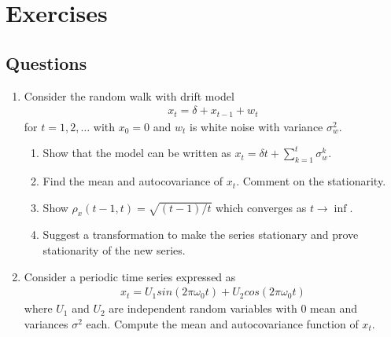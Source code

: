 \documentclass[../../time_series_notes.tex]{subfiles}
\begin{document}
\section{Exercises}
\subsection{Questions}
\begin{enumerate}
    \item Consider the random walk with drift model
    \begin{align*}
        x_{t} = \delta + x_{t-1} + w_{t}
    \end{align*}
    for $t = 1,2,\ldots$ with $x_{0} = 0$ and $w_{t}$ is white noise with variance $\sigma_{w}^{2}$.
    \begin{enumerate}
        \item Show that the model can be written as $x_{t} = \delta t + \sum_{k=1}^{t}\sigma_{w}^{k}$.
        \item Find the mean and autocovariance of $x_{t}$. Comment on the stationarity.
        \item Show $\rho_{x}(t-1,t) = \sqrt{(t-1)/t}$ which converges as $t\rightarrow \inf$.
        \item Suggest a transformation to make the series stationary and prove stationarity of the new series.
    \end{enumerate}

    \item Consider a periodic time series expressed as
    \begin{align*}
        x_{t} = U_{1}sin(2\pi \omega_{0}t) + U_{2}cos(2\pi \omega_{0}t)
    \end{align*}
    where $U_{1}$ and $U_{2}$ are independent random variables with $0$ mean and variances $\sigma^{2}$ each. Compute the mean and autocovariance function of $x_{t}$.
\end{enumerate}
\end{document}
